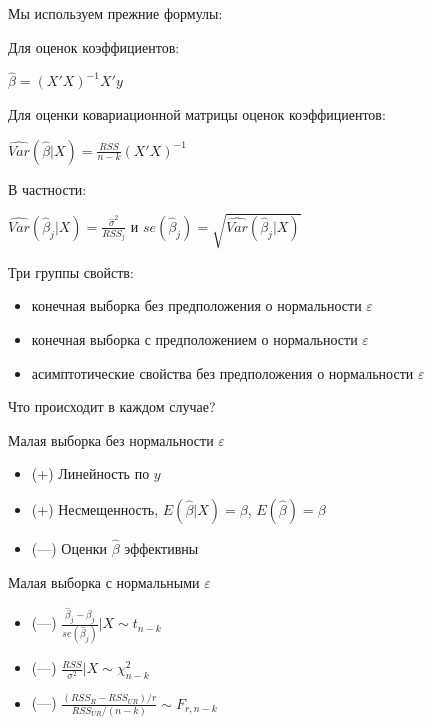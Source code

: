 \documentclass[ignorenonframetext,]{beamer}
\begin{document}
\begin{frame}{Мы используем прежние формулы:}

Для оценок коэффициентов:

$\hat{\beta}=(X'X)^{-1}X'y$

Для оценки ковариационной матрицы оценок коэффициентов:

$\widehat{Var}(\hat{\beta}|X)=\frac{RSS}{n-k}(X'X)^{-1}$

В частности:

$\widehat{Var}(\hat{\beta}_j|X)=\frac{\hat{\sigma}^2}{RSS_j}$ и
$se(\hat{\beta}_j)=\sqrt{\widehat{Var}(\hat{\beta}_j|X)}$

\end{frame}

\begin{frame}{Три группы свойств:}

\begin{itemize}
\item
  конечная выборка без предположения о нормальности $\varepsilon$
\item
  конечная выборка с предположением о нормальности $\varepsilon$
\item
  асимптотические свойства без предположения о нормальности
  $\varepsilon$
\end{itemize}

Что происходит в каждом случае?

\end{frame}

\begin{frame}{Малая выборка без нормальности $\varepsilon$}

\begin{itemize}
\item
  (+) Линейность по $y$
\item
  (+) Несмещенность, $E(\hat{\beta}|X)=\beta$, $E(\hat{\beta})=\beta$
\item
  (---) Оценки $\hat{\beta}$ эффективны
\end{itemize}

\end{frame}

\begin{frame}{Малая выборка с нормальными $\varepsilon$}

\begin{itemize}
\item
  (---)
  $\frac{\hat{\beta}_j-\beta_j}{se(\hat{\beta}_j)} | X \sim t_{n-k}$
\item
  (---) $\frac{RSS}{\sigma^2} |X \sim \chi^2_{n-k}$
\item
  (---) $\frac{(RSS_R-RSS_{UR})/r}{RSS_{UR}/(n-k)} \sim F_{r,n-k}$
\end{itemize}

\end{frame}
\end{document}
